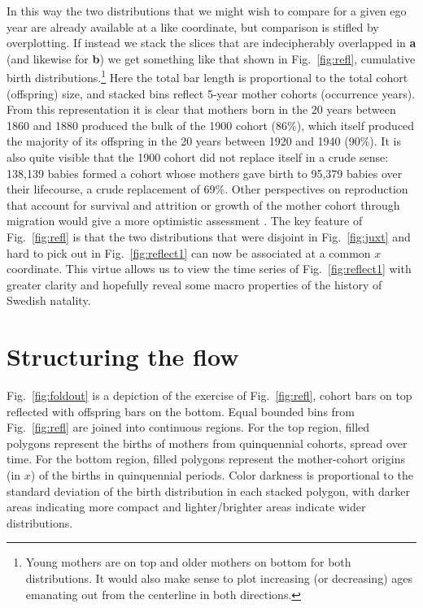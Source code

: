 \documentclass{article}
\begin{document}
In this way the two distributions that we might wish to compare for a given ego year are already available at a like coordinate, but comparison is stifled by overplotting. If instead we stack the slices that are indecipherably overlapped in \textbf{a} (and likewise for \textbf{b}) we get something like that shown in Fig.~\ref{fig:refl}, cumulative birth distributions.\footnote{Young mothers are on top and older mothers on bottom for both distributions. It would also make sense to plot increasing (or decreasing) ages emanating out from the centerline in both directions.} Here the total bar length is proportional to the total cohort (offspring) size, and stacked bins reflect 5-year mother cohorts (occurrence years). From this representation it is clear that mothers born in the 20 years between 1860 and 1880 produced the bulk of the 1900 cohort (86\%), which itself produced the majority of its offspring in the 20 years between 1920 and 1940 (90\%). It is also quite visible that the 1900 cohort did not replace itself in a crude sense: 138,139 babies formed a cohort whose mothers gave birth to 95,379 babies over their lifecourse, a crude replacement of 69\%. Other perspectives on reproduction that account for survival and attrition or growth of the mother cohort through migration would give a more optimistic assessment \citep{henry1965reflexions}. The key feature of Fig.~\ref{fig:refl} is that the two distributions that were disjoint in Fig.~\ref{fig:juxt} and hard to pick out in Fig.~\ref{fig:reflect1} can now be associated at a common $x$ coordinate. This virtue allows us to view the time series of Fig.~\ref{fig:reflect1} with greater clarity and hopefully reveal some macro properties of the history of Swedish natality.

\section{Structuring the flow}
Fig.~\ref{fig:foldout} is a depiction of the exercise of Fig.~\ref{fig:refl}, cohort bars on top reflected with offspring bars on the bottom. Equal bounded bins from Fig.~\ref{fig:refl} are joined into continuous regions. For the top region, filled polygons represent the births of mothers from quinquennial cohorts, spread over time. For the bottom region, filled polygons represent the mother-cohort origins (in $x$) of the births in quinquennial periods. Color darkness is proportional to the standard deviation of the birth distribution in each stacked polygon, with darker areas indicating more compact and lighter/brighter areas indicate wider distributions.
\end{document}
